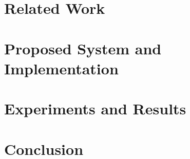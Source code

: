 \documentclass[conference]{IEEEtran}
\begin{document}
\section{Related Work}


\section{Proposed System and Implementation}


\section{Experiments and Results}


\section{Conclusion}


\balance


\end{document}
